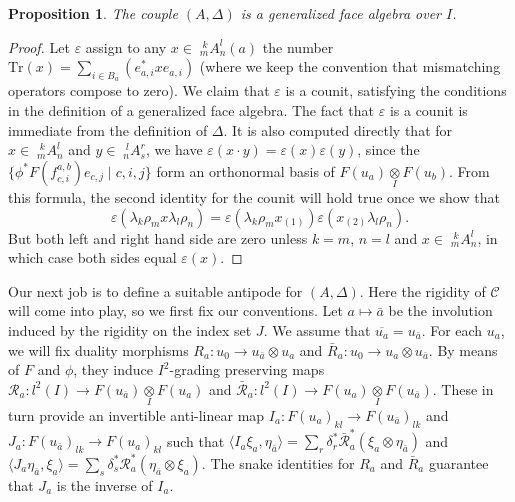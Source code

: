 \documentclass[12pt]{article}
\theoremstyle{change}
\newcommand{\Tr}{\mathrm{Tr}}
\newcommand{\CatC}{\mathcal{C}}
\newcommand{\Gr}[5]{\;{}^{\;#2}_{#4}#1_{#5}^{#3}}%
\newcommand{\iitimes}{\underset{I}{\otimes}}
\newtheorem{Prop}[Theorem]{Proposition}
\theoremstyle{definition}
\numberwithin{equation}{section}
\begin{document}

\begin{Prop} The couple $(A,\Delta)$ is a generalized face algebra over $I$.
\end{Prop}
\begin{proof} Let $\varepsilon$ assign to any $x\in \Gr{A}{k}{l}{m}{n}(a)$ the number $\Tr(x) = \sum_{i\in B_a} (e_{a,i}^*xe_{a,i})$ (where we keep the convention that mismatching operators compose to zero). We claim that $\varepsilon$ is a counit, satisfying the conditions in the definition of a generalized face algebra. The fact that $\varepsilon$ is a counit is immediate from the definition of $\Delta$. It is also computed directly that for $x\in \Gr{A}{k}{l}{m}{n}$ and $y\in \Gr{A}{l}{r}{n}{s}$, we have $\varepsilon(x\cdot y) = \varepsilon(x)\varepsilon(y)$, since the $\{\phi^*F(f_{c,i}^{a,b})e_{c,j}\mid c,i,j\}$ form an orthonormal basis of $F(u_a)\iitimes F(u_b)$. From this formula, the second identity for the counit will hold true once we show that \[\varepsilon(\lambda_k\rho_mx\lambda_l\rho_n) = \varepsilon(\lambda_k\rho_mx_{(1)})\varepsilon(x_{(2)}\lambda_l\rho_n).\] But both left and right hand side are zero unless $k=m$, $n=l$ and $x\in \Gr{A}{k}{l}{m}{n}$, in which case both sides equal $\varepsilon(x)$.
\end{proof}

Our next job is to define a suitable antipode for $(A,\Delta)$. Here the rigidity of $\CatC$ will come into play, so we first fix our conventions. Let $a \mapsto \bar{a}$ be the involution induced by the rigidity on the index set $J$. We assume that $\overline{u_a} = u_{\bar{a}}$. For each $u_a$, we will fix duality morphisms $R_a: u_0\rightarrow u_{\bar{a}}\otimes u_a$ and $\bar{R}_a: u_0\rightarrow u_a\otimes u_{\bar{a}}$. By means of $F$ and $\phi$, they induce $I^2$-grading preserving maps $\mathscr{R}_a: l^2(I) \rightarrow F(u_{\bar{a}})\iitimes F(u_a)$ and $\bar{\mathscr{R}}_a:l^2(I) \rightarrow F(u_a)\iitimes F(u_{\bar{a}})$. These in turn provide an invertible anti-linear map $I_a:F(u_a)_{kl}\rightarrow F(u_{\bar{a}})_{lk}$ and $J_a: F(u_{\bar{a}})_{lk}\rightarrow F(u_{a})_{kl}$ such that $\langle I_{a}\xi_a,\eta_{\bar{a}}\rangle = \sum_r\delta_r^* \bar{\mathscr{R}}_a^*(\xi_a\otimes \eta_{\bar{a}})$ and $\langle J_a\eta_{\bar{a}},\xi_a\rangle = \sum_s \delta_s^* \mathscr{R}_a^* (\eta_{\bar{a}}\otimes \xi_a)$. The snake identities for $R_a$ and $\bar{R}_a$ guarantee that $J_a$ is the inverse of $I_a$.
\end{document}
